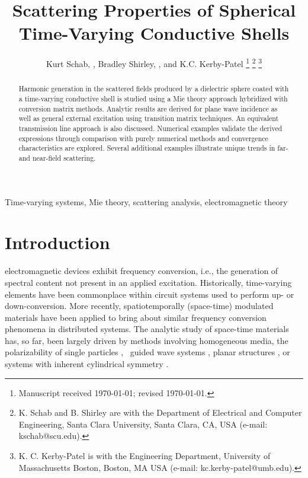 \documentclass[article]{IEEEtran}
\title{Scattering Properties of Spherical Time-Varying Conductive Shells}
\author{Kurt Schab, \IEEEmembership{Member, IEEE}, Bradley Shirley, \IEEEmembership{Student Member, IEEE}, and K.C. Kerby-Patel \IEEEmembership{Senior Member, IEEE}
\thanks{Manuscript received  \today; revised \today.}
\thanks{K. Schab and B. Shirley are with the Department of Electrical and Computer Engineering, Santa Clara University, Santa Clara, CA, USA (e-mail: kschab@scu.edu).}
\thanks{K. C. Kerby-Patel is with the Engineering Department, University of Massachusetts Boston, Boston, MA USA (e-mail: kc.kerby-patel@umb.edu).}}
\begin{document}
%
%
\maketitle
\setcounter{page}{1}

\maketitle

\begin{abstract}
    Harmonic generation in the scattered fields produced by a dielectric sphere coated with a time-varying conductive shell is studied using a Mie theory approach hybridized with conversion matrix methods.  Analytic results are derived for plane wave incidence as well as general external excitation using transition matrix techniques.  An equivalent transmission line approach is also discussed.  Numerical examples validate the derived expressions through comparison with purely numerical methods and convergence characteristics are explored.  Several additional examples illustrate unique trends in far- and near-field scattering.  
\end{abstract}

\begin{IEEEkeywords}
Time-varying systems, Mie theory, scattering analysis, electromagnetic theory
\end{IEEEkeywords}

\section{Introduction}

 electromagnetic devices exhibit frequency conversion, i.e., the generation of spectral content not present in an applied excitation.  Historically, time-varying elements have been commonplace within circuit systems used to perform up- or down-conversion. More recently, spatiotemporally (space-time) modulated materials have been applied to bring about similar frequency conversion phenomena in distributed systems.  The analytic study of space-time materials has, so far, been largely driven by methods involving homogeneous media\cite{hayrapetyan2016electromagnetic,caloz2019spacetime,koutserimpas2020electromagnetic}, the polarizability of single particles \cite{mirmoosa2020dipole},~%
guided wave systems \cite{hadad2020soft}, planar structures \cite{morgenthaler1958velocity,holberg1966parametric,Fante1973OnTP,harfoush1991scattering,wu2019serrodyne,salary2018electrically,Inampudi:19,pantazopoulos2019layered,taravati2020space,li2021temporal}, or systems with inherent cylindrical symmetry \cite{Wright_2010,salary2018}.
\end{document}
